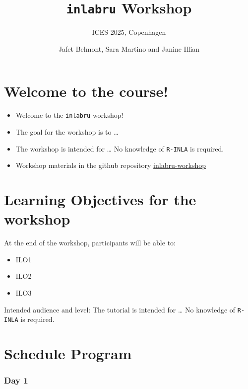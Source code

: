 \documentclass[
  letterpaper,
  DIV=11,
  numbers=noendperiod]{scrartcl}
\title{\texttt{inlabru} Workshop}
\subtitle{ICES 2025, Copenhagen}
\author{Jafet Belmont, Sara Martino and Janine Illian}
\date{}
\makeatletter
\providecommand{\tightlist}{%
  \setlength{\itemsep}{0pt}\setlength{\parskip}{0pt}}\usepackage{longtable,booktabs,array}
\renewcommand{\maketitle}{\bgroup\setlength{\parindent}{0pt}
\begin{flushleft}
  {\sffamily\huge\textbf{\MakeUppercase{\@title}}} \vspace{0.3cm} \newline
  {\Large {\@subtitle}} \newline
  \@author
\end{flushleft}\egroup
}
\makeatother
\begin{document}
\maketitle

\pagestyle{mystyle}


\section{Welcome to the course!}\label{welcome-to-the-course}

\begin{itemize}
\tightlist
\item
  Welcome to the \texttt{inlabru} workshop!
\item
  The goal for the workshop is to \ldots{}
\item
  The workshop is intended for \ldots{} No knowledge of \texttt{R-INLA}
  is required.
\item
  Workshop materials in the github repository
  \href{https://github.com/Ecol-Stats/inlabru_workshop/tree/main/docs/copenague}{inlabru-workshop}
\end{itemize}

\section{Learning Objectives for the
workshop}\label{learning-objectives-for-the-workshop}

At the end of the workshop, participants will be able to:

\begin{itemize}
\tightlist
\item
  ILO1
\item
  ILO2
\item
  ILO3
\end{itemize}

Intended audience and level: The tutorial is intended for \ldots{} No
knowledge of \texttt{R-INLA} is required.

\section{Schedule Program}\label{schedule-tabs}

\subsubsection{Day 1}
\end{document}
